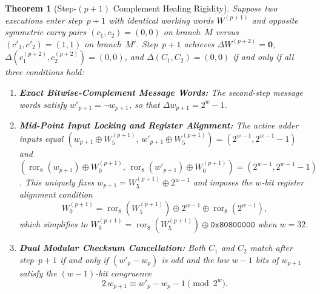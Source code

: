 \documentclass[11pt,a4paper]{article}
\newtheorem{theorem}{Theorem}
\theoremstyle{definition}
\theoremstyle{remark}
\newcommand{\ror}{\operatorname{ror}}
\begin{document}
\begin{theorem}[Step-$(p+1)$ Complement Healing Rigidity]
\label{thm:healing-rigidity}
Suppose two executions enter step~$p+1$ with identical working words $W^{(p+1)}$ and opposite symmetric carry pairs $(c_1, c_2) = (0, 0)$ on branch~$M$ versus $(c'_1, c'_2) = (1, 1)$ on branch~$M'$. Step~$p+1$ achieves $\Delta W^{(p+2)} = \mathbf{0}$, $\Delta(c_1^{(p+2)}, c_2^{(p+2)}) = (0, 0)$, and $\Delta(C_1, C_2) = (0, 0)$ if and only if all three conditions hold:
\begin{enumerate}[leftmargin=2em]
    \item \textbf{Exact Bitwise-Complement Message Words:} The second-step message words satisfy $w'_{p+1} = \neg w_{p+1}$, so that $\Delta w_{p+1} = 2^w - 1$.
    \item \textbf{Mid-Point Input Locking and Register Alignment:} The active adder inputs equal $(w_{p+1} \oplus W^{(p+1)}_5,\, w'_{p+1} \oplus W^{(p+1)}_5) = (2^{w-1}, 2^{w-1} - 1)$ and $(\ror_8(w_{p+1}) \oplus W^{(p+1)}_0,\, \ror_8(w'_{p+1}) \oplus W^{(p+1)}_0) = (2^{w-1}, 2^{w-1} - 1)$. This uniquely fixes $w_{p+1} = W^{(p+1)}_5 \oplus 2^{w-1}$ and imposes the $w$-bit register alignment condition
    \begin{equation}
        W^{(p+1)}_0 = \ror_8(W^{(p+1)}_5) \oplus 2^{w-1} \oplus \ror_8(2^{w-1}),
        \label{eq:w0-w5-lock}
    \end{equation}
    which simplifies to $W^{(p+1)}_0 = \ror_8(W^{(p+1)}_5) \oplus \mathtt{0x80800000}$ when $w = 32$.
    \item \textbf{Dual Modular Checksum Cancellation:} Both $C_1$ and $C_2$ match after step~$p+1$ if and only if $(w'_p - w_p)$ is odd and the low $w - 1$ bits of $w_{p+1}$ satisfy the $(w-1)$-bit congruence
    \begin{equation}
        2\,w_{p+1} \equiv w'_p - w_p - 1 \pmod{2^w}.
        \label{eq:checksum-heal}
    \end{equation}
\end{enumerate}
\end{theorem}
\end{document}
